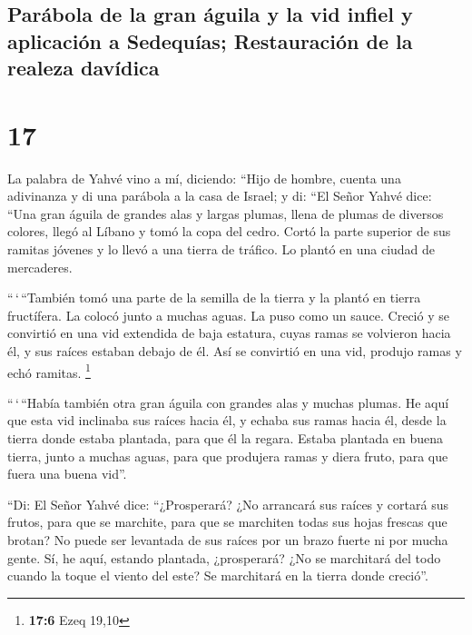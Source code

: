 \hypertarget{paruxe1bola-de-la-gran-uxe1guila-y-la-vid-infiel-y-aplicaciuxf3n-a-sedequuxedas-restauraciuxf3n-de-la-realeza-davuxeddica}{%
\subsection{Parábola de la gran águila y la vid infiel y aplicación a
Sedequías; Restauración de la realeza
davídica}\label{paruxe1bola-de-la-gran-uxe1guila-y-la-vid-infiel-y-aplicaciuxf3n-a-sedequuxedas-restauraciuxf3n-de-la-realeza-davuxeddica}}

\hypertarget{section-16}{%
\section{17}\label{section-16}}

 La palabra de Yahvé vino a mí, diciendo: 
``Hijo de hombre, cuenta una adivinanza y di una parábola a la casa de
Israel;  y di: ``El Señor Yahvé dice: ``Una gran águila de
grandes alas y largas plumas, llena de plumas de diversos colores, llegó
al Líbano y tomó la copa del cedro.  Cortó la parte
superior de sus ramitas jóvenes y lo llevó a una tierra de tráfico. Lo
plantó en una ciudad de mercaderes.

 ``\,`\,``También tomó una parte de la semilla de la
tierra y la plantó en tierra fructífera. La colocó junto a muchas aguas.
La puso como un sauce.  Creció y se convirtió en una vid
extendida de baja estatura, cuyas ramas se volvieron hacia él, y sus
raíces estaban debajo de él. Así se convirtió en una vid, produjo ramas
y echó ramitas. \footnote{\textbf{17:6} Ezeq 19,10}

 ``\,`\,``Había también otra gran águila con grandes alas
y muchas plumas. He aquí que esta vid inclinaba sus raíces hacia él, y
echaba sus ramas hacia él, desde la tierra donde estaba plantada, para
que él la regara.  Estaba plantada en buena tierra, junto
a muchas aguas, para que produjera ramas y diera fruto, para que fuera
una buena vid''.

 ``Di: El Señor Yahvé dice: ``¿Prosperará? ¿No arrancará
sus raíces y cortará sus frutos, para que se marchite, para que se
marchiten todas sus hojas frescas que brotan? No puede ser levantada de
sus raíces por un brazo fuerte ni por mucha gente.  Sí,
he aquí, estando plantada, ¿prosperará? ¿No se marchitará del todo
cuando la toque el viento del este? Se marchitará en la tierra donde
creció''.

